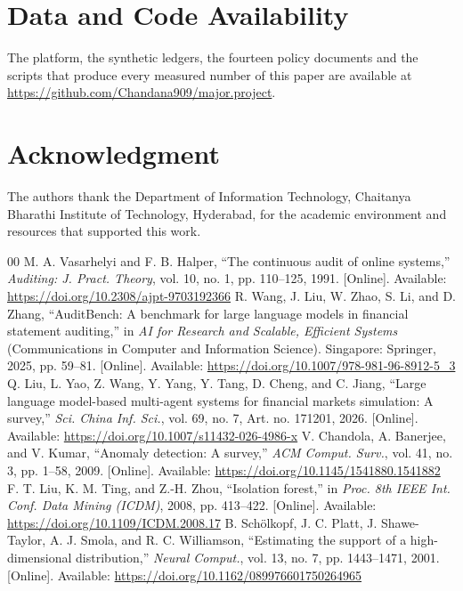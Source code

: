 \documentclass[conference]{IEEEtran}
\begin{document}
\section*{Data and Code Availability}
The platform, the synthetic ledgers, the fourteen policy documents and the scripts that produce every measured number of this paper are available at \url{https://github.com/Chandana909/major.project}.

\section*{Acknowledgment}
The authors thank the Department of Information Technology, Chaitanya Bharathi Institute of Technology, Hyderabad, for the academic environment and resources that supported this work.

\begin{thebibliography}{00}
 M. A. Vasarhelyi and F. B. Halper, ``The continuous audit of online systems,'' \textit{Auditing: J. Pract. Theory}, vol. 10, no. 1, pp. 110--125, 1991. [Online]. Available: \url{https://doi.org/10.2308/ajpt-9703192366}
 R. Wang, J. Liu, W. Zhao, S. Li, and D. Zhang, ``AuditBench: A benchmark for large language models in financial statement auditing,'' in \textit{AI for Research and Scalable, Efficient Systems} (Communications in Computer and Information Science). Singapore: Springer, 2025, pp. 59--81. [Online]. Available: \url{https://doi.org/10.1007/978-981-96-8912-5_3}
 Q. Liu, L. Yao, Z. Wang, Y. Yang, Y. Tang, D. Cheng, and C. Jiang, ``Large language model-based multi-agent systems for financial markets simulation: A survey,'' \textit{Sci. China Inf. Sci.}, vol. 69, no. 7, Art. no. 171201, 2026. [Online]. Available: \url{https://doi.org/10.1007/s11432-026-4986-x}
 V. Chandola, A. Banerjee, and V. Kumar, ``Anomaly detection: A survey,'' \textit{ACM Comput. Surv.}, vol. 41, no. 3, pp. 1--58, 2009. [Online]. Available: \url{https://doi.org/10.1145/1541880.1541882}
 F. T. Liu, K. M. Ting, and Z.-H. Zhou, ``Isolation forest,'' in \textit{Proc. 8th IEEE Int. Conf. Data Mining (ICDM)}, 2008, pp. 413--422. [Online]. Available: \url{https://doi.org/10.1109/ICDM.2008.17}
 B. Sch\"{o}lkopf, J. C. Platt, J. Shawe-Taylor, A. J. Smola, and R. C. Williamson, ``Estimating the support of a high-dimensional distribution,'' \textit{Neural Comput.}, vol. 13, no. 7, pp. 1443--1471, 2001. [Online]. Available: \url{https://doi.org/10.1162/089976601750264965}

\end{thebibliography}
\end{document}

